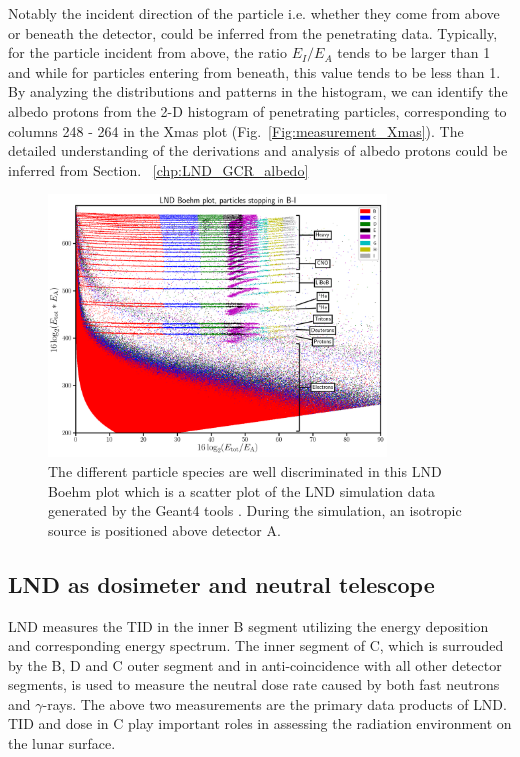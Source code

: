 Notably the incident direction of the particle i.e. whether they come from above or beneath the detector, could be inferred from the penetrating data. Typically, for the particle incident from above, the ratio $E_I/E_A$ tends to be larger than 1 and while for particles entering from beneath, this value tends to be less than 1. 
By analyzing the distributions and patterns in the histogram, we can identify the albedo protons from the 2-D histogram of penetrating particles, corresponding to columns 248 - 264 in the Xmas plot (Fig.~\ref{Fig:measurement_Xmas}).
The detailed understanding of the derivations and analysis of albedo protons could be inferred from Section. ~\ref{chp:LND_GCR_albedo}


\begin{figure}
    \centering
    \includegraphics[width=0.8\textwidth]{images/LND_Boehm_plot_isotropic_on_top_of_A_annotated.png}
    \caption[LND Boehm plot of stopping particles based on the simulated data]{The different particle species are well discriminated in this LND Boehm plot which is a scatter plot of the \ac{LND} simulation data generated by the \ac{Geant4} tools \citep{Agostinelli-2003}. During the simulation, an isotropic source is positioned above detector A.}
    \label{Fig:LND-Boehm-plot}
\end{figure}


\subsection{LND as dosimeter and neutral telescope}

\ac{LND} measures the \ac{TID} in the inner B segment utilizing the energy deposition and corresponding energy spectrum. The inner segment of C, which is surrouded by the B, D and C outer segment and in anti-coincidence with all other detector segments, is used to measure the neutral dose rate caused by both fast neutrons and $\gamma$-rays. The above two measurements are the primary data products of \ac{LND}. \ac{TID} and dose in C play important roles in assessing the radiation environment on the lunar surface. 

